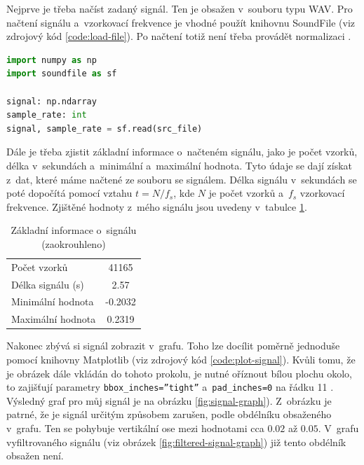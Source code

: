 \documentclass[a4paper, 11pt, final]{article}
\begin{document}
Nejprve je třeba načíst zadaný signál. Ten je obsažen v~souboru typu WAV. Pro načtení signálu a~vzorkovací frekvence je vhodné použít knihovnu SoundFile \cite{soundfile-reference} (viz zdrojový kód \ref{code:load-file}). Po načtení totiž není třeba provádět normalizaci \cite{zmolikova-demo}.

\begin{lstlisting}[language=Python, caption=Načtení signálu z~WAV souboru, label={code:load-file}]
import numpy as np
import soundfile as sf

signal: np.ndarray
sample_rate: int
signal, sample_rate = sf.read(src_file)
\end{lstlisting}

Dále je třeba zjistit základní informace o~načteném signálu, jako je počet vzorků, délka v~sekundách a~minimální a~maximální hodnota. Tyto údaje se dají získat z~dat, které máme načtené ze souboru se signálem. Délka signálu v~sekundách se poté dopočítá pomocí vztahu $t = N / f_s$, kde $N$ je počet vzorků a~$f_s$ vzorkovací frekvence. Zjištěné hodnoty z~mého signálu jsou uvedeny v~tabulce \ref{tab:signal-info}.

\begin{table}[ht]
    \centering
    \begin{tabular}{|l|c|}
        \hline
        Počet vzorků & 41165 \\
        Délka signálu (s) & 2.57 \\
        Minimální hodnota & -0.2032 \\
        Maximální hodnota & 0.2319 \\
        \hline
    \end{tabular}
    \caption{Základní informace o~signálu (zaokrouhleno)}
    \label{tab:signal-info}
\end{table}

Nakonec zbývá si signál zobrazit v~grafu. Toho lze docílit poměrně jednoduše pomocí knihovny Matplotlib \cite{matplotlib-reference} (viz zdrojový kód \ref{code:plot-signal}). Kvůli tomu, že je obrázek dále vkládán do tohoto prokolu, je nutné oříznout bílou plochu okolo, to zajišťují parametry \texttt{bbox\_inches=”tight”} a~\texttt{pad\_inches=0} na řádku 11 \cite{zmolikova-demo}. Výsledný graf pro můj signál je na obrázku \ref{fig:signal-graph}). Z~obrázku je patrné, že je signál určitým způsobem zarušen, podle obdélníku obsaženého v~grafu. Ten se pohybuje vertikální ose mezi hodnotami cca $0.02$ až $0.05$. V~grafu vyfiltrovaného signálu (viz obrázek \ref{fig:filtered-signal-graph}) již tento obdélník obsažen není.
\end{document}
